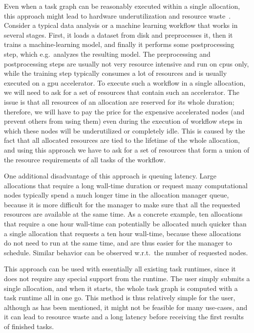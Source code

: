 Even when a task graph can be reasonably executed within a single allocation, this approach might
lead to hardware underutilization and resource waste~\cite{ehpc}. Consider a typical
data analysis or a machine learning workflow that works in several stages. First, it loads a
dataset from disk and preprocesses it, then it trains a machine-learning model, and finally it
performs some postprocessing step, which e.g.\ analyzes the resulting model. The preprocessing and
postprocessing steps are usually not very resource intensive and run on \glspl{cpu}
only, while the training step typically consumes a lot of resources and is usually executed on a
\gls{gpu} accelerator. To execute such a workflow in a single allocation, we will
need to ask for a set of resources that contain such an accelerator. The issue is that all
resources of an allocation are reserved for its whole duration; therefore, we will have to pay the
price for the expensive accelerated nodes (and prevent others from using them) even during the
execution of workflow steps in which these nodes will be underutilized or completely idle. This is
caused by the fact that all allocated resources are tied to the lifetime of the whole allocation,
and using this approach we have to ask for a set of resources that form a union of the resource
requirements of all tasks of the workflow.

One additional disadvantage of this approach is queuing latency. Large allocations that require a
long wall-time duration or request many computational nodes typically spend a much longer time in
the allocation manager queue, because it is more difficult for the manager to make sure that all
the requested resources are available at the same time. As a concrete example, ten allocations that
require a one hour wall-time can potentially be allocated much quicker than a single allocation
that requests a ten hour wall-time, because these allocations do not need to run at the same time,
and are thus easier for the manager to schedule. Similar behavior can be observed w.r.t.\ the
number of requested nodes.

This approach can be used with essentially all existing task runtimes, since it does not require
any special support from the runtime. The user simply submits a single allocation, and when it
starts, the whole task graph is computed with a task runtime all in one go. This method is thus
relatively simple for the user, although as has been mentioned, it might not be feasible for many
use-cases, and it can lead to resource waste and a long latency before receiving the first results
of finished tasks.

